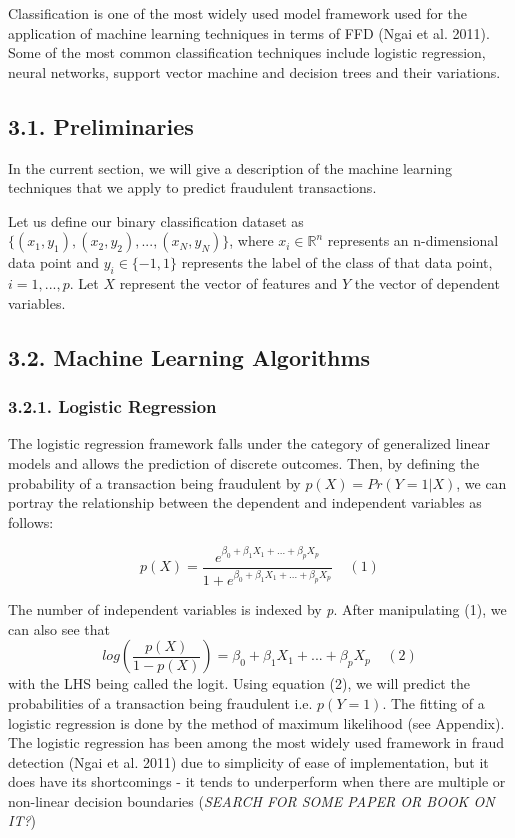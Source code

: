 \documentclass[12pt,]{article}
\begin{document}
Classification is one of the most widely used model framework used for
the application of machine learning techniques in terms of FFD (Ngai et
al. 2011). Some of the most common classification techniques include
logistic regression, neural networks, support vector machine and
decision trees and their variations.

\hypertarget{preliminaries}{%
\subsection{3.1. Preliminaries}\label{preliminaries}}

In the current section, we will give a description of the machine
learning techniques that we apply to predict fraudulent transactions.

Let us define our binary classification dataset as
\({\{(x_1,y_1),(x_2,y_2),...,(x_N,y_N)\}}\), where
\(x_i\in \mathbb{R}^n\) represents an n-dimensional data point and
\(y_i \in \{-1,1\}\) represents the label of the class of that data
point, \(i = 1,...,p\). Let \(X\) represent the vector of features and
\(Y\) the vector of dependent variables.

\hypertarget{machine-learning-algorithms}{%
\subsection{3.2. Machine Learning
Algorithms}\label{machine-learning-algorithms}}

\hypertarget{logistic-regression}{%
\subsubsection{3.2.1. Logistic Regression}\label{logistic-regression}}

The logistic regression framework falls under the category of
generalized linear models and allows the prediction of discrete
outcomes. Then, by defining the probability of a transaction being
fraudulent by \(p(X) = Pr(Y=1|X)\), we can portray the relationship
between the dependent and independent variables as follows:

\[p(X) = \frac{e^{\beta_0 + \beta_1X_1 + ... + \beta_pX_p}}{1 + e^{\beta_0 + \beta_1X_1 + ... + \beta_pX_p}}\;\;\;\;(1)\]

The number of independent variables is indexed by \emph{p}. After
manipulating (1), we can also see that
\[log(\frac{p(X)}{1-p(X)})=\beta_0+ \beta_1X_1 + ... + \beta_pX_p\;\;\;\;(2)\]
with the LHS being called the logit. Using equation (2), we will predict
the probabilities of a transaction being fraudulent i.e. \(p(Y = 1)\).
The fitting of a logistic regression is done by the method of maximum
likelihood (see Appendix). The logistic regression has been among the
most widely used framework in fraud detection (Ngai et al. 2011) due to
simplicity of ease of implementation, but it does have its shortcomings
- it tends to underperform when there are multiple or non-linear
decision boundaries (\emph{SEARCH FOR SOME PAPER OR BOOK ON IT?})
\end{document}
